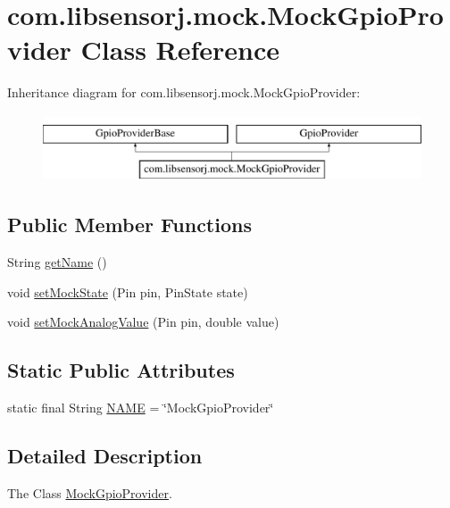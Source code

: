 \hypertarget{classcom_1_1libsensorj_1_1mock_1_1MockGpioProvider}{}\section{com.\+libsensorj.\+mock.\+Mock\+Gpio\+Provider Class Reference}
\label{classcom_1_1libsensorj_1_1mock_1_1MockGpioProvider}
Inheritance diagram for com.\+libsensorj.\+mock.\+Mock\+Gpio\+Provider\+:\begin{figure}[H]
\begin{center}
\leavevmode
\includegraphics[height=2.000000cm]{classcom_1_1libsensorj_1_1mock_1_1MockGpioProvider}
\end{center}
\end{figure}
\subsection*{Public Member Functions}
\begin{DoxyCompactItemize}
\item 
String \hyperlink{classcom_1_1libsensorj_1_1mock_1_1MockGpioProvider_a85baa28148a2bc5d86eb3c125cf9ab95}{get\+Name} ()
\item 
void \hyperlink{classcom_1_1libsensorj_1_1mock_1_1MockGpioProvider_a944ae745f738b724735611f83016ea7e}{set\+Mock\+State} (Pin pin, Pin\+State state)
\item 
void \hyperlink{classcom_1_1libsensorj_1_1mock_1_1MockGpioProvider_a973c113dff5f3a22241911b0bd9da82e}{set\+Mock\+Analog\+Value} (Pin pin, double value)
\end{DoxyCompactItemize}
\subsection*{Static Public Attributes}
\begin{DoxyCompactItemize}
\item 
static final String \hyperlink{classcom_1_1libsensorj_1_1mock_1_1MockGpioProvider_a55a768da1d26ad878cb1bb2c55de8b0c}{N\+A\+M\+E} = \char`\"{}Mock\+Gpio\+Provider\char`\"{}
\end{DoxyCompactItemize}


\subsection{Detailed Description}
The Class \hyperlink{classcom_1_1libsensorj_1_1mock_1_1MockGpioProvider}{Mock\+Gpio\+Provider}. 

